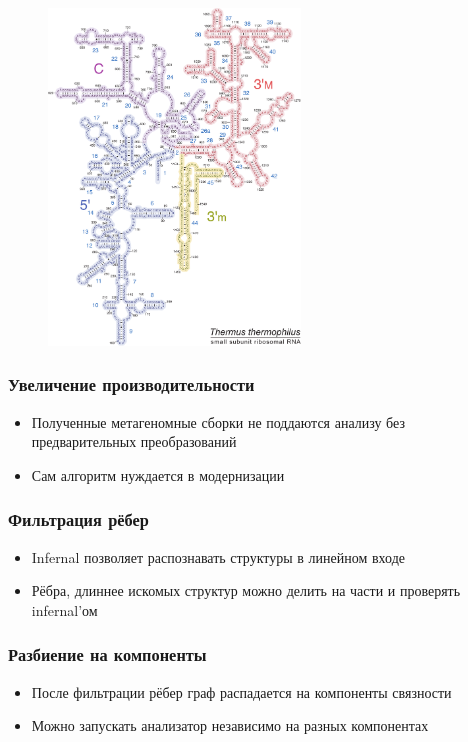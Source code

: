 \documentclass{beamer}
\begin{document}
    \begin{frame}
        \begin{figure}[t]
            \centering
            \includegraphics[width=6.7cm]{pictures/thermus_16s_2ndry.pdf}
        \end{figure}
    \end{frame}

    \begin{frame}
        \frametitle{Увеличение производительности}
        \begin{itemize}
            \item Полученные метагеномные сборки не поддаются анализу без предварительных преобразований
            \item Сам алгоритм нуждается в модернизации
        \end{itemize}
    \end{frame}

    \begin{frame}
        \frametitle{Фильтрация рёбер}
        \begin{itemize}
            \item Infernal позволяет распознавать структуры в линейном входе
            \item Рёбра, длиннее искомых структур можно делить на части и проверять infernal'ом
        \end{itemize}
    \end{frame}

    \begin{frame}
        \frametitle{Разбиение на компоненты}
        \begin{itemize}
            \item После фильтрации рёбер граф распадается на компоненты связности
            \item Можно запускать анализатор независимо на разных компонентах
        \end{itemize}
    \end{frame}
    
\end{document}
